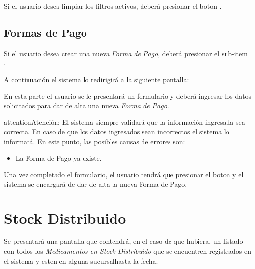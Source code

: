 \documentclass[a4paper,10pt,spanish]{sphinxmanual}
\begin{document}
Si el usuario desea limpiar los filtros activos, deberá presionar el boton .



\section{Formas de Pago}
\label{formasdepago::doc}\label{formasdepago:formas-de-pago}
Si el usuario desea crear una nueva \emph{Forma de Pago}, deberá presionar el sub-item .


A continuación el sistema lo redirigirá a la siguiente pantalla:


En esta parte el usuario se le presentará un formulario y deberá ingresar los datos solicitados para dar de alta una nueva \emph{Forma de Pago}.

\begin{notice}{attention}{Atención:}
El sistema siempre validará que la información ingresada sea correcta. En caso de que los datos ingresados sean incorrectos el sistema lo informará.
En este punto, las posibles causas de errores son:
\begin{itemize}
\item {} 
La Forma de Pago ya existe.

\end{itemize}
\end{notice}

Una vez completado el formulario, el usuario tendrá que presionar el boton  y el sistema se encargará de dar de alta la nueva Forma de Pago.


\chapter{Stock Distribuido}
\label{stockdistribuido::doc}\label{stockdistribuido:stock-distribuido}
Se presentará una pantalla que contendrá, en el caso de que hubiera, un listado con todos los \emph{Medicamentos en Stock Distribuido} que se encuentren registrados en el sistema y esten en alguna sucursalhasta la fecha.
\end{document}
